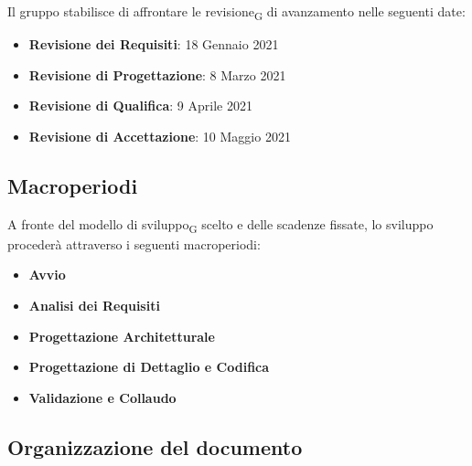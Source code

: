 Il gruppo stabilisce di affrontare le revisione\textsubscript{G} di avanzamento nelle seguenti date:
\begin{itemize}
	\item \textbf{Revisione dei Requisiti}: 18 Gennaio 2021
	\item \textbf{Revisione di Progettazione}: 8 Marzo 2021 
	\item \textbf{Revisione di Qualifica}: 9 Aprile 2021
	\item \textbf{Revisione di Accettazione}: 10 Maggio 2021	
\end{itemize}


\subsection{Macroperiodi}

A fronte del modello di sviluppo\textsubscript{G} scelto e delle scadenze fissate, lo sviluppo procederà attraverso i seguenti macroperiodi:
\begin{itemize}
	\item \textbf{Avvio}
	\item \textbf{Analisi dei Requisiti}
	\item \textbf{Progettazione Architetturale}
	\item \textbf{Progettazione di Dettaglio e Codifica}
	\item \textbf{Validazione e Collaudo}
\end{itemize}



\subsection{Organizzazione del documento}

